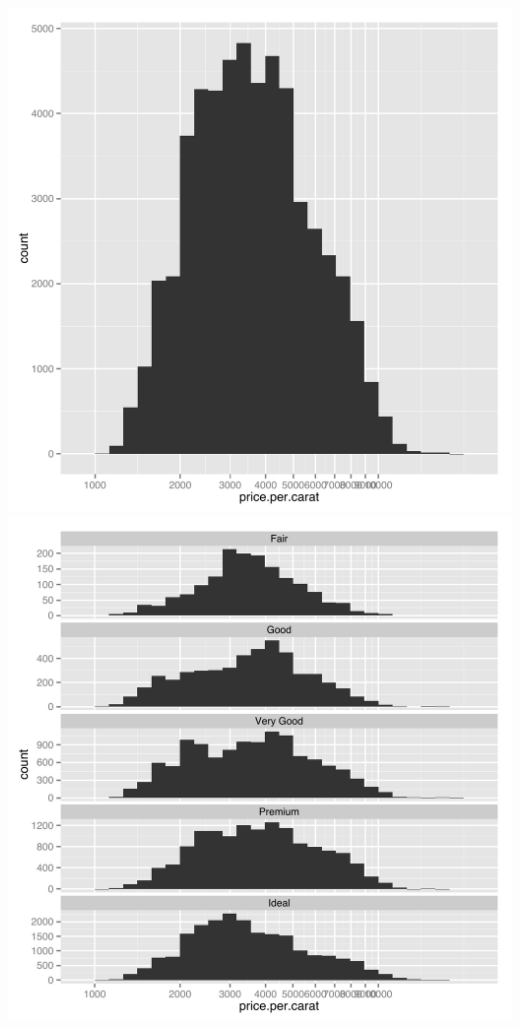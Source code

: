 \documentclass{article}\usepackage[]{graphicx}\usepackage[]{color}
\newenvironment{knitrout}{}{} %
\begin{document}
\begin{knitrout}
{\centering \includegraphics[width=.4\linewidth]{figs/unnamed-chunk-2-1} 
\includegraphics[width=.4\linewidth]{figs/unnamed-chunk-2-2} 

}



\end{knitrout}
\end{document}
